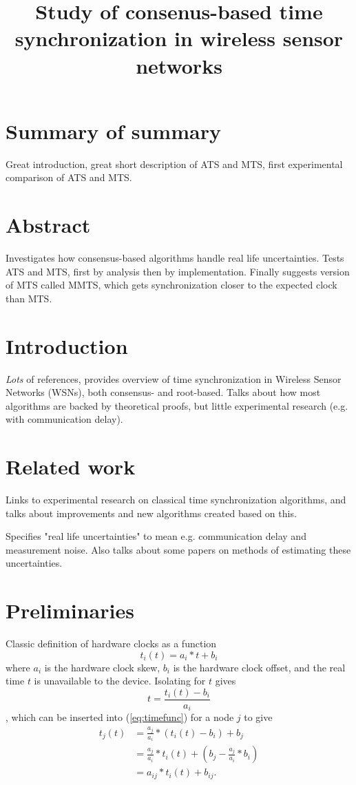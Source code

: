 \documentclass{article}
\title{Study of consenus-based time synchronization in wireless sensor networks}
\begin{document}
\maketitle
\section{Summary of summary}
Great introduction, great short description of ATS and MTS, first experimental comparison of ATS and MTS.

\section{Abstract}
Investigates how consensus-based algorithms handle real life uncertainties. Tests ATS and MTS, first by analysis then by implementation. Finally suggests version of MTS called MMTS, which gets synchronization closer to the expected clock than MTS.

\section{Introduction}
\textit{Lots} of references, provides overview of time synchronization in Wireless Sensor Networks (WSNs), both consensus- and root-based. Talks about how most algorithms are backed by theoretical proofs, but little experimental research (e.g. with communication delay).

\section{Related work}
Links to experimental research on classical time synchronization algorithms, and talks about improvements and new algorithms created based on this.

Specifies "real life uncertainties" to mean e.g. communication delay and measurement noise. Also talks about some papers on methods of estimating these uncertainties.

\section{Preliminaries}
Classic definition of hardware clocks as a function
\begin{equation} \label{eq:timefunc}
    t_i(t) = a_i * t + b_i
\end{equation}
where $a_i$ is the hardware clock skew, $b_i$ is the hardware clock offset, and the real time $t$ is unavailable to the device. Isolating for $t$ gives
    $$ t = \frac{t_i(t) - b_i}{a_i} $$,
which can be inserted into (\ref{eq:timefunc}) for a node $j$ to give
\begin{align}
    t_j(t) &= \frac{a_j}{a_i} * (t_i(t) - b_i) + b_j \nonumber \\
        &= \frac{a_j}{a_i} * t_i(t) + (b_j - \frac{a_j}{a_i} * b_i) \nonumber \\ 
        &= a_{ij} * t_i(t) + b_{ij}. \label{eq:timefunc2}
\end{align}
\end{document}
